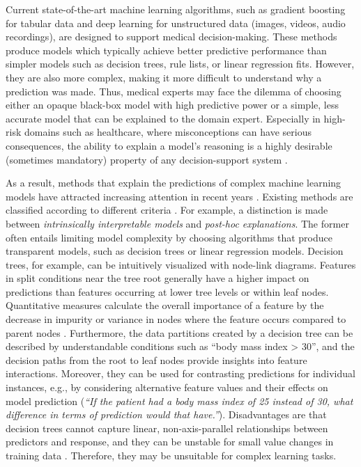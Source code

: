 \documentclass[
  oneside]{book}
\begin{document}
Current state-of-the-art machine learning algorithms, such as gradient boosting \autocite{Friedman:PDP2001} for tabular data and deep learning \autocite{Goodfellow:DL2016} for unstructured data (images, videos, audio recordings), are designed to support medical decision-making.
These methods produce models which typically achieve better predictive performance than simpler models such as decision trees, rule lists, or linear regression fits.
However, they are also more complex, making it more difficult to understand why a prediction was made.
Thus, medical experts may face the dilemma of choosing either an opaque black-box model with high predictive power or a simple, less accurate model that can be explained to the domain expert.
Especially in high-risk domains such as healthcare, where misconceptions can have serious consequences, the ability to explain a model's reasoning is a highly desirable (sometimes mandatory) property of any decision-support system \autocite{guidotti2018survey,molnar2020interpretable}.

As a result, methods that explain the predictions of complex machine learning models have attracted increasing attention in recent years \autocite{carvalho2019machine,adadi2018peeking}.
Existing methods are classified according to different criteria \autocite{molnar2020interpretable}.
For example, a distinction is made between \emph{intrinsically interpretable models} and \emph{post-hoc explanations}.
The former often entails limiting model complexity by choosing algorithms that produce transparent models, such as decision trees or linear regression models.
Decision trees, for example, can be intuitively visualized with node-link diagrams.
Features in split conditions near the tree root generally have a higher impact on predictions than features occurring at lower tree levels or within leaf nodes.
Quantitative measures calculate the overall importance of a feature by the decrease in impurity or variance in nodes where the feature occurs compared to parent nodes \autocite{kazemitabar2017variable}.
Furthermore, the data partitions created by a decision tree can be described by understandable conditions such as ``body mass index \textgreater{} 30'', and the decision paths from the root to leaf nodes provide insights into feature interactions.
Moreover, they can be used for contrasting predictions for individual instances, e.g., by considering alternative feature values and their effects on model prediction (\emph{``If the patient had a body mass index of 25 instead of 30, what difference in terms of prediction would that have.''}).
Disadvantages are that decision trees cannot capture linear, non-axis-parallel relationships between predictors and response, and they can be unstable for small value changes in training data \autocite{hastie2009elements}.
Therefore, they may be unsuitable for complex learning tasks.
\end{document}
